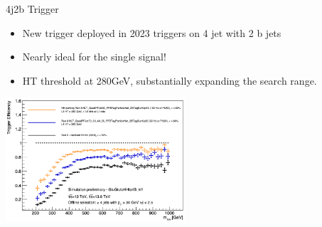 \documentclass[]{beamer}
\begin{document}
\begin{frame}{4j2b Trigger}
  \begin{itemize}
  \item New trigger deployed in 2023 triggers on 4 jet with 2 b jets 
  \item Nearly ideal for the single \stopq{} signal!
  \item HT threshold at 280GeV, substantially expanding the search range. 
  \end{itemize}
  \begin{center}
    \includegraphics[width=0.5\textwidth]{figures/4j2b.png}
  \end{center}
  
\end{frame}
\end{document}

